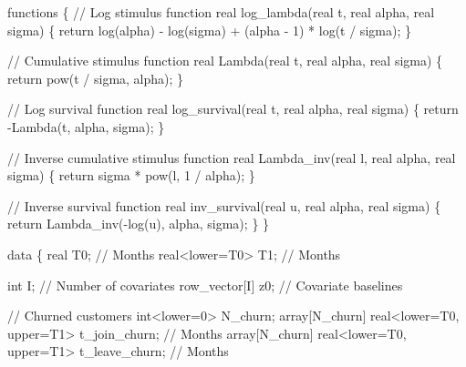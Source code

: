 \documentclass[
  letterpaper,
  DIV=11,
  numbers=noendperiod]{scrartcl}
\newenvironment{Shaded}{\begin{snugshade}}{\end{snugshade}}
\newcommand{\CommentTok}[1]{\textcolor[rgb]{0.37,0.37,0.37}{#1}}
\newcommand{\ControlFlowTok}[1]{\textcolor[rgb]{0.00,0.23,0.31}{#1}}
\newcommand{\DataTypeTok}[1]{\textcolor[rgb]{0.68,0.00,0.00}{#1}}
\newcommand{\DecValTok}[1]{\textcolor[rgb]{0.68,0.00,0.00}{#1}}
\newcommand{\KeywordTok}[1]{\textcolor[rgb]{0.00,0.23,0.31}{#1}}
\newcommand{\NormalTok}[1]{\textcolor[rgb]{0.00,0.23,0.31}{#1}}
\begin{document}
\begin{codelisting}

\caption{\texttt{model5.stan}}

\begin{Shaded}
\begin{Highlighting}[]
\KeywordTok{functions}\NormalTok{ \{}
  \CommentTok{// Log stimulus function}
  \DataTypeTok{real}\NormalTok{ log\_lambda(}\DataTypeTok{real}\NormalTok{ t, }\DataTypeTok{real}\NormalTok{ alpha, }\DataTypeTok{real}\NormalTok{ sigma) \{}
    \ControlFlowTok{return}\NormalTok{ log(alpha) {-} log(sigma) + (alpha {-} }\DecValTok{1}\NormalTok{) * log(t / sigma);}
\NormalTok{  \}}
  
  \CommentTok{// Cumulative stimulus function}
  \DataTypeTok{real}\NormalTok{ Lambda(}\DataTypeTok{real}\NormalTok{ t, }\DataTypeTok{real}\NormalTok{ alpha, }\DataTypeTok{real}\NormalTok{ sigma) \{}
    \ControlFlowTok{return}\NormalTok{ pow(t / sigma, alpha);}
\NormalTok{  \}}

  \CommentTok{// Log survival function}
  \DataTypeTok{real}\NormalTok{ log\_survival(}\DataTypeTok{real}\NormalTok{ t, }\DataTypeTok{real}\NormalTok{ alpha, }\DataTypeTok{real}\NormalTok{ sigma) \{}
    \ControlFlowTok{return}\NormalTok{ {-}Lambda(t, alpha, sigma);}
\NormalTok{  \}}

  \CommentTok{// Inverse cumulative stimulus function}
  \DataTypeTok{real}\NormalTok{ Lambda\_inv(}\DataTypeTok{real}\NormalTok{ l, }\DataTypeTok{real}\NormalTok{ alpha, }\DataTypeTok{real}\NormalTok{ sigma) \{}
    \ControlFlowTok{return}\NormalTok{ sigma * pow(l, }\DecValTok{1}\NormalTok{ / alpha);}
\NormalTok{  \}}
  
  \CommentTok{// Inverse survival function}
  \DataTypeTok{real}\NormalTok{ inv\_survival(}\DataTypeTok{real}\NormalTok{ u, }\DataTypeTok{real}\NormalTok{ alpha, }\DataTypeTok{real}\NormalTok{ sigma) \{}
    \ControlFlowTok{return}\NormalTok{ Lambda\_inv({-}log(u), alpha, sigma);}
\NormalTok{  \}}
\NormalTok{\}}

\KeywordTok{data}\NormalTok{ \{}
  \DataTypeTok{real}\NormalTok{           T0; }\CommentTok{// Months}
  \DataTypeTok{real}\NormalTok{\textless{}}\KeywordTok{lower}\NormalTok{=T0\textgreater{} T1; }\CommentTok{// Months}

  \DataTypeTok{int}\NormalTok{ I;            }\CommentTok{// Number of covariates}
  \DataTypeTok{row\_vector}\NormalTok{[I] z0; }\CommentTok{// Covariate baselines}

  \CommentTok{// Churned customers}
  \DataTypeTok{int}\NormalTok{\textless{}}\KeywordTok{lower}\NormalTok{=}\DecValTok{0}\NormalTok{\textgreater{} N\_churn;}
  \DataTypeTok{array}\NormalTok{[N\_churn] }\DataTypeTok{real}\NormalTok{\textless{}}\KeywordTok{lower}\NormalTok{=T0, }\KeywordTok{upper}\NormalTok{=T1\textgreater{} t\_join\_churn;  }\CommentTok{// Months}
  \DataTypeTok{array}\NormalTok{[N\_churn] }\DataTypeTok{real}\NormalTok{\textless{}}\KeywordTok{lower}\NormalTok{=T0, }\KeywordTok{upper}\NormalTok{=T1\textgreater{} t\_leave\_churn; }\CommentTok{// Months}


\end{Highlighting}
\end{Shaded}
\end{codelisting}
\end{document}
